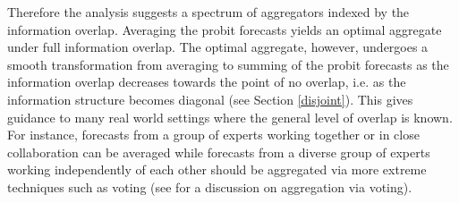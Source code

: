\documentclass[11pt]{article}
\renewcommand{\P}{\mathbb{P}}
\newtheorem{observation}[theorem]{Observation}
\theoremstyle{definition}
\theoremstyle{definition}
\begin{document}
Therefore the analysis suggests a spectrum of aggregators indexed by the information overlap. Averaging the probit forecasts yields an optimal aggregate under full information overlap. The optimal aggregate, however, undergoes a smooth transformation from averaging to summing of the probit forecasts as the information overlap decreases towards the point of no overlap, i.e. as the information structure becomes diagonal (see Section \ref{disjoint}). This gives guidance to many real world settings where the general level of overlap is known. For instance, forecasts from a group of experts working together or in close collaboration can be averaged while forecasts from a diverse group of experts working independently of each other should be aggregated via more extreme techniques such as voting (see \citet{parunak2013characterizing} for a discussion on aggregation via voting).






\end{document}
